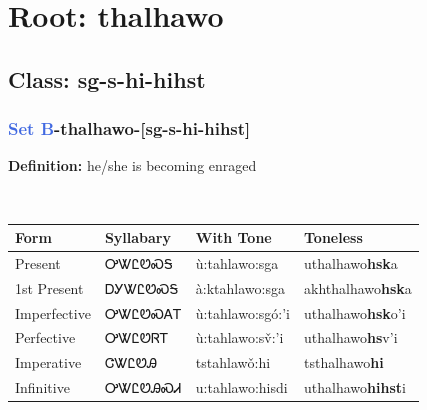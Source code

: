 \needspace{4in}
\section*{Root: thalhawo}
\nopagebreak
{}
\needspace{3in}
\subsection*{Class: sg-s-hi-hihst}
\nopagebreak
\needspace{2in}
\subsubsection*{\textcolor{RoyalBlue}{Set B}{-}\textbf{thalhawo}{-}[sg-s-hi-hihst]}
\nopagebreak
\textbf{Definition: } he/she is becoming enraged
\\[0.5em]
\begin{tabularx}{\textwidth}{l X X X}%
\toprule%
\textbf{Form}&\textbf{Syllabary}&\textbf{With Tone}&\textbf{Toneless}\\%
\midrule%
Present&ᎤᏔᏝᏬᏍᎦ&ù:tahlawo:sga&uthalhawo\textbf{hsk}a\\%
1st Present&ᎠᎩᏔᏝᏬᏍᎦ&à:ktahlawo:sga&akhthalhawo\textbf{hsk}a\\%
Imperfective&ᎤᏔᏝᏬᏍᎪᎢ&ù:tahlawo:sgó:’i&uthalhawo\textbf{hsk}o'i\\%
Perfective&ᎤᏔᏝᏬᏒᎢ&ù:tahlawo:sv̌:’i&uthalhawo\textbf{hs}v'i\\%
Imperative&ᏣᏔᏝᏬᎯ&tstahlawǒ:hi&tsthalhawo\textbf{hi}\\%
Infinitive&ᎤᏔᏝᏬᎯᏍᏗ&u:tahlawo:hisdi&uthalhawo\textbf{hihst}i\\%
\bottomrule%
\end{tabularx}
\\[1em]